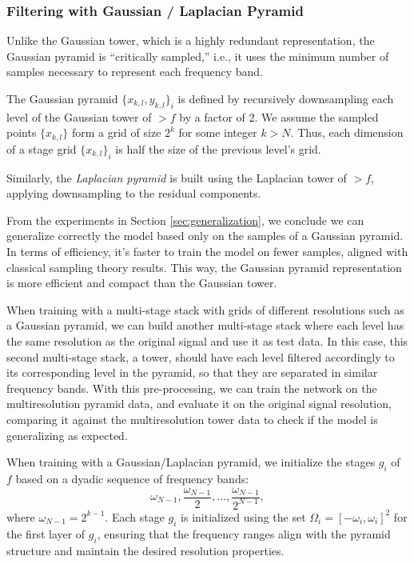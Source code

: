 \subsubsection{Filtering with Gaussian / Laplacian Pyramid}

Unlike the Gaussian tower, which is a highly redundant representation, the Gaussian pyramid is ``critically sampled,'' i.e., it uses the minimum number of samples necessary to represent each frequency band.

The Gaussian pyramid $\{x_{k,l}, y_{k,l}\}_i$ is defined by recursively downsampling each level of the Gaussian tower of $\gt{f}$ by a factor of 2. We assume the sampled points $\{x_{k,l}\}$ form a grid of size $2^k$ for some integer $k>N$. Thus, each dimension of a stage grid $\{x_{k,l}\}_i$ is half the size of the previous level's grid.

Similarly, the \textit{Laplacian pyramid} is built using the Laplacian tower of $\gt{f}$, applying downsampling to the residual components.

From the experiments in Section \ref{sec:generalization}, we conclude we can generalize correctly the model based only on the samples of a Gaussian pyramid. In terms of efficiency, it's faster to train the model on fewer samples, aligned with classical sampling theory results. This way, the Gaussian pyramid representation is more efficient and compact than the Gaussian tower. 

When training with a multi-stage stack with grids of different resolutions such as a Gaussian pyramid, we can build another multi-stage stack where each level has the same resolution as the original signal and use it as test data. In this case, this second multi-stage stack, a tower, should have each level filtered accordingly to its corresponding level in the pyramid, so that they are separated in similar frequency bands. With this pre-processing, we can train the network on the multiresolution pyramid data, and evaluate it on the original signal resolution, comparing it against the multiresolution tower data to check if the model is generalizing as expected.

When training with a Gaussian/Laplacian pyramid, we initialize the stages $g_i$ of $f$ based on a dyadic sequence of frequency bands:
\[
\omega_{N-1}, \frac{\omega_{N-1}}{2}, \ldots, \frac{\omega_{N-1}}{2^{N-1}},
\]
where $\omega_{N-1} = 2^{k-1}$. Each stage $g_i$ is initialized using the set $\Omega_i = \left[-\omega_i, \omega_i\right]^2$ for the first layer of $g_i$, ensuring that the frequency ranges align with the pyramid structure and maintain the desired resolution properties.

